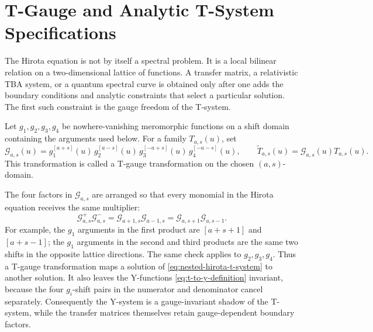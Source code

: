 \section{T-Gauge and Analytic T-System Specifications}

The Hirota equation is not by itself a spectral problem.  It is a local
bilinear relation on a two-dimensional lattice of functions.  A transfer
matrix, a relativistic TBA system, or a quantum spectral curve is obtained
only after one adds the boundary conditions and analytic constraints that
select a particular solution.  The first such constraint is the gauge freedom
of the T-system.

\begin{definition}
\label{def:t-system-gauge-transformation}
Let \(g_1,g_2,g_3,g_4\) be nowhere-vanishing meromorphic functions on a shift
domain containing the arguments used below.  For a family \(T_{a,s}(u)\), set
\begin{equation}
  \mathcal G_{a,s}(u)
  =
  g_1^{[a+s]}(u)\,
  g_2^{[a-s]}(u)\,
  g_3^{[-a+s]}(u)\,
  g_4^{[-a-s]}(u),
  \qquad
  \widetilde T_{a,s}(u)=\mathcal G_{a,s}(u)T_{a,s}(u).
  \label{eq:t-system-gauge-transformation}
\end{equation}
This transformation is called a T-gauge transformation on the chosen
\((a,s)\)-domain.
\end{definition}

The four factors in \(\mathcal G_{a,s}\) are arranged so that every monomial
in the Hirota equation receives the same multiplier:
\begin{equation}
  \mathcal G_{a,s}^{+}\mathcal G_{a,s}^{-}
  =
  \mathcal G_{a+1,s}\mathcal G_{a-1,s}
  =
  \mathcal G_{a,s+1}\mathcal G_{a,s-1}.
  \label{eq:t-gauge-hirota-cocycle}
\end{equation}
For example, the \(g_1\) arguments in the first product are
\([a+s+1]\) and \([a+s-1]\); the \(g_1\) arguments in the second and third
products are the same two shifts in the opposite lattice directions.  The
same check applies to \(g_2,g_3,g_4\).  Thus a T-gauge transformation maps a
solution of \eqref{eq:nested-hirota-t-system} to another solution.  It also
leaves the Y-functions \eqref{eq:t-to-y-definition} invariant, because the
four \(g_i\)-shift pairs in the numerator and denominator cancel separately.
Consequently the Y-system is a gauge-invariant shadow of the T-system, while
the transfer matrices themselves retain gauge-dependent boundary factors.


